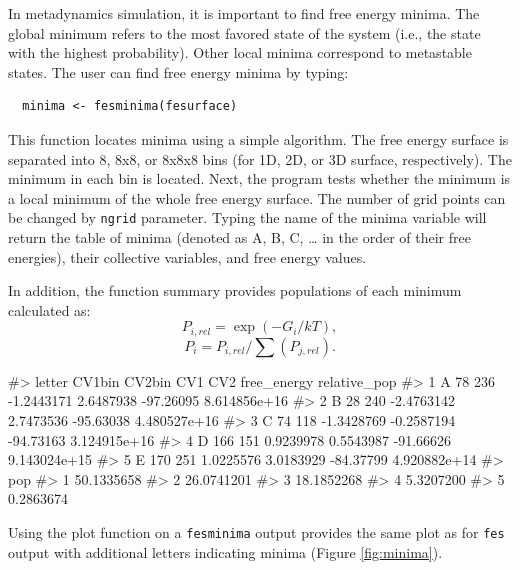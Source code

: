 In metadynamics simulation, it is important to find free energy minima.
The global minimum refers to the most favored state of the system (i.e.,
the state with the highest probability). Other local minima correspond
to metastable states. The user can find free energy minima by typing:

\begin{verbatim}
  minima <- fesminima(fesurface)
\end{verbatim}

This function locates minima using a simple algorithm. The free energy
surface is separated into 8, 8x8, or 8x8x8 bins (for 1D, 2D, or 3D
surface, respectively). The minimum in each bin is located. Next, the
program tests whether the minimum is a local minimum of the whole free
energy surface. The number of grid points can be changed by
\texttt{ngrid} parameter. Typing the name of the minima variable will
return the table of minima (denoted as A, B, C, \ldots{} in the order of
their free energies), their collective variables, and free energy
values.

In addition, the function summary provides populations of each minimum
calculated as: \begin{equation}
P_{i,rel} = \exp(-G_i/kT),
\end{equation} \begin{equation}
P_i = P_{i,rel} / \sum (P_{j,rel}).
\end{equation}

\begin{Schunk}
\begin{Soutput}
#>   letter CV1bin CV2bin        CV1        CV2 free_energy relative_pop
#> 1      A     78    236 -1.2443171  2.6487938   -97.26095 8.614856e+16
#> 2      B     28    240 -2.4763142  2.7473536   -95.63038 4.480527e+16
#> 3      C     74    118 -1.3428769 -0.2587194   -94.73163 3.124915e+16
#> 4      D    166    151  0.9239978  0.5543987   -91.66626 9.143024e+15
#> 5      E    170    251  1.0225576  3.0183929   -84.37799 4.920882e+14
#>          pop
#> 1 50.1335658
#> 2 26.0741201
#> 3 18.1852268
#> 4  5.3207200
#> 5  0.2863674
\end{Soutput}
\end{Schunk}

Using the plot function on a \texttt{fesminima} output provides the same
plot as for \texttt{fes} output with additional letters indicating
minima (Figure \ref{fig:minima}).

